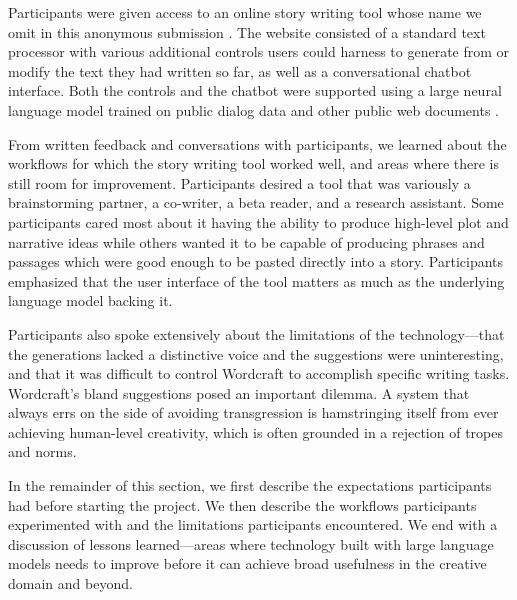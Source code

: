 Participants were given access to an online story writing tool whose name we omit in this anonymous submission \citep{yuan2022wordcraft}.
The website consisted of a standard text processor with various additional controls users could harness to generate from or modify the text they had written so far, as well as a conversational chatbot interface.
Both the controls and the chatbot were supported using a large neural language model trained on public dialog data and other public web documents \citep{thoppilan2022lamda}.

From written feedback and conversations with participants, we learned about the workflows for which the story writing tool worked well, and areas where there is still room for improvement.
Participants desired a tool that was variously a brainstorming partner, a co-writer, a beta reader, and a research assistant.
Some participants cared most about it having the ability to produce high-level plot and narrative ideas while others wanted it to be capable of producing phrases and passages which were good enough to be pasted directly into a story.
Participants emphasized that the user interface of the tool matters as much as the underlying language model backing it.



Participants also spoke extensively about the limitations of the technology---that the generations lacked a distinctive voice and the suggestions were uninteresting, and that it was difficult to control Wordcraft to accomplish specific writing tasks.
Wordcraft's bland suggestions posed an important dilemma.
A system that always errs on the side of avoiding transgression is hamstringing itself from ever achieving human-level creativity, which is often grounded in a rejection of tropes and norms.

In the remainder of this section, we first describe the expectations participants had before starting the project.
We then describe the workflows participants experimented with and the limitations participants encountered.
We end with a discussion of lessons learned---areas where technology built with large language models needs to improve before it can achieve broad usefulness in the creative domain and beyond.



